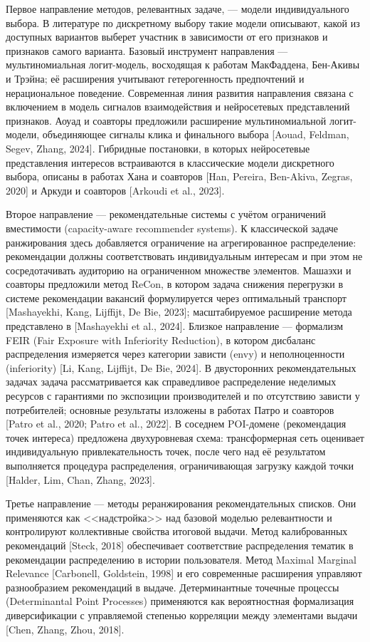 Первое направление методов, релевантных задаче, --- модели индивидуального выбора. В литературе по дискретному выбору такие модели описывают, какой из доступных вариантов выберет участник в зависимости от его признаков и признаков самого варианта. Базовый инструмент направления --- мультиномиальная логит-модель, восходящая к работам МакФаддена, Бен-Акивы и Трэйна; её расширения учитывают гетерогенность предпочтений и нерациональное поведение. Современная линия развития направления связана с включением в модель сигналов взаимодействия и нейросетевых представлений признаков. Аоуад и соавторы предложили расширение мультиномиальной логит-модели, объединяющее сигналы клика и финального выбора [Aouad, Feldman, Segev, Zhang, 2024]. Гибридные постановки, в которых нейросетевые представления интересов встраиваются в классические модели дискретного выбора, описаны в работах Хана и соавторов [Han, Pereira, Ben-Akiva, Zegras, 2020] и Аркуди и соавторов [Arkoudi et al., 2023].

Второе направление --- рекомендательные системы с учётом ограничений вместимости (capacity-aware recommender systems). К классической задаче ранжирования здесь добавляется ограничение на агрегированное распределение: рекомендации должны соответствовать индивидуальным интересам и при этом не сосредотачивать аудиторию на ограниченном множестве элементов. Машаэхи и соавторы предложили метод ReCon, в котором задача снижения перегрузки в системе рекомендации вакансий формулируется через оптимальный транспорт [Mashayekhi, Kang, Lijffijt, De Bie, 2023]; масштабируемое расширение метода представлено в [Mashayekhi et al., 2024]. Близкое направление --- формализм FEIR (Fair Exposure with Inferiority Reduction), в котором дисбаланс распределения измеряется через категории зависти (envy) и неполноценности (inferiority) [Li, Kang, Lijffijt, De Bie, 2024]. В двусторонних рекомендательных задачах задача рассматривается как справедливое распределение неделимых ресурсов с гарантиями по экспозиции производителей и по отсутствию зависти у потребителей; основные результаты изложены в работах Патро и соавторов [Patro et al., 2020; Patro et al., 2022]. В соседнем POI-домене (рекомендация точек интереса) предложена двухуровневая схема: трансформерная сеть оценивает индивидуальную привлекательность точек, после чего над её результатом выполняется процедура распределения, ограничивающая загрузку каждой точки [Halder, Lim, Chan, Zhang, 2023].

Третье направление --- методы реранжирования рекомендательных списков. Они применяются как <<надстройка>> над базовой моделью релевантности и контролируют коллективные свойства итоговой выдачи. Метод калиброванных рекомендаций [Steck, 2018] обеспечивает соответствие распределения тематик в рекомендации распределению в истории пользователя. Метод Maximal Marginal Relevance [Carbonell, Goldstein, 1998] и его современные расширения управляют разнообразием рекомендаций в выдаче. Детерминантные точечные процессы (Determinantal Point Processes) применяются как вероятностная формализация диверсификации с управляемой степенью корреляции между элементами выдачи [Chen, Zhang, Zhou, 2018].

